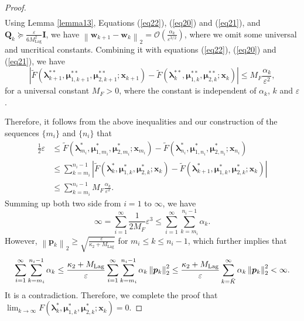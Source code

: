 \documentclass[aos]{imsart}
\numberwithin{equation}{section}
\theoremstyle{plain}
\begin{document}
\begin{appendix}
\begin{proof}
\begin{equation*}
\begin{split}
        \end{split}
    \end{equation*}
    Using Lemma \ref{lemma13}, Equations (\ref{eq22}), (\ref{eq20}) and (\ref{eq21}), and $\bm{Q}_{k} \succeq \frac{\varepsilon}{ 6 M_{\text{Lag}}^2} \bm{I}$, we have $\left\| \bm{w}_{k+1} - \bm{w}_{k} \right\|_2 = \mathcal{O}\left( \frac{\alpha_k}{\varepsilon^{3/2}} \right)$, where we omit some universal and uncritical constants. Combining it with equations (\ref{eq22}), (\ref{eq20}) and (\ref{eq21}), we have 
    \begin{equation*}
        \left|  \widetilde{F}(\bm{\lambda}_{k+1}^{**}, \bm{\mu}_{1,k+1}^{**}, \bm{\mu}_{2,k+1}^{**}; \bm{x}_{k+1}) -  \widetilde{F}(\bm{\lambda}_{k}^{**}, \bm{\mu}_{1,k}^{**}, \bm{\mu}_{2,k}^{**}; \bm{x}_{k}) \right| \leq M_{F} \frac{\alpha_k}{\varepsilon^2},
    \end{equation*}
    for a universal constant $M_{F}>0$, where the constant is independent of $\alpha_k$, $k$ and $\varepsilon$.
    
    
    Therefore, it follows from the above inequalities and our construction of the sequences $\{m_i\}$ and $\{n_i\}$ that
    \begin{equation}
        \begin{split}
            \frac{1}{2} \varepsilon & \leq \widetilde{F}(\bm{\lambda}_{m_i}^{*}, \bm{\mu}_{1,m_i}^{*}, \bm{\mu}_{2,m_i}^{*}; \bm{x}_{m_i}) - \widetilde{F}(\bm{\lambda}_{n_i}^{*}, \bm{\mu}_{1,n_i}^{*}, \bm{\mu}_{2,n_i}^{*}; \bm{x}_{n_i}) \\
            & \leq \sum_{k=m_i}^{n_i -1} \left |\widetilde{F}(\bm{\lambda}_{k}^{*}, \bm{\mu}_{1,k}^{*}, \bm{\mu}_{2,k}^{*}; \bm{x}_{k}) - \widetilde{F}(\bm{\lambda}_{k+1}^{*}, \bm{\mu}_{1,k}^{*}, \bm{\mu}_{2,k}^{*}; \bm{x}_{k}) \right| \\
            & \leq \sum_{k=m_i}^{n_i -1} M_{F}  \frac{\alpha_k}{ \varepsilon^2}.
        \end{split}
    \end{equation}
    Summing up both two side from $i=1$ to $\infty$, we have 
    \begin{equation*}
         \infty = \sum_{i=1}^{\infty} \frac{1}{2 M_{F}} \varepsilon^3 \leq  \sum_{i=1}^{\infty} \sum_{k=m_i}^{n_i -1} \alpha_k.
    \end{equation*}
    However, $\left\| \bm{p}_{k} \right\|_2 \geq \sqrt{\frac{\varepsilon}{\kappa_2 + M_{\text{Lag}} }}$ for $m_i \leq k \leq n_i-1$, which further implies that 
    \begin{equation*}
         \sum_{i=1}^{\infty} \sum_{k=m_i}^{n_i -1}  \alpha_k  \leq \frac{ \kappa_2 + M_{\text{Lag}} }{\varepsilon } \sum_{i=1}^{\infty} \sum_{k=m_i}^{n_i -1} \alpha_k  \left\| \bm{p}_{k} \right\|_2^2 \leq \frac{ \kappa_2 + M_{\text{Lag}} }{\varepsilon } \sum_{k=\Bar{K}}^{\infty} \alpha_k  \left\| \bm{p}_{k} \right\|_2^2 < \infty.
    \end{equation*}
    It is a contradiction. Therefore, we complete the proof that $\lim_{k \to \infty} F(\bm{\lambda}_{k}^{*}, \bm{\mu}_{1,k}^{*}, \bm{\mu}_{2,k}^{*}; \bm{x}_k) = 0$.
\end{proof}




\end{appendix}
\end{document}
